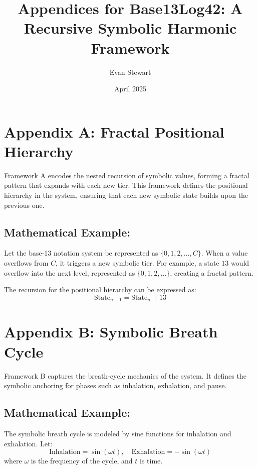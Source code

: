 \documentclass[12pt]{article}
\begin{document}
\title{Appendices for Base13Log42: A Recursive Symbolic Harmonic Framework}
\author{Evan Stewart}
\date{April 2025}
\maketitle

\tableofcontents
\newpage

\section*{Appendix A: Fractal Positional Hierarchy}

Framework A encodes the nested recursion of symbolic values, forming a fractal pattern that expands with each new tier. This framework defines the positional hierarchy in the system, ensuring that each new symbolic state builds upon the previous one.

\subsection*{Mathematical Example:}
Let the base-13 notation system be represented as $\{0, 1, 2, \dots, C\}$. When a value overflows from $C$, it triggers a new symbolic tier. For example, a state $13$ would overflow into the next level, represented as $\{0, 1, 2, \dots\}$, creating a fractal pattern.

The recursion for the positional hierarchy can be expressed as:
\[
\text{State}_{n+1} = \text{State}_n + 13
\]

\newpage

\section*{Appendix B: Symbolic Breath Cycle}

Framework B captures the breath-cycle mechanics of the system. It defines the symbolic anchoring for phases such as inhalation, exhalation, and pause.

\subsection*{Mathematical Example:}
The symbolic breath cycle is modeled by sine functions for inhalation and exhalation. Let:
\[
\text{Inhalation} = \sin(\omega t), \quad \text{Exhalation} = -\sin(\omega t)
\]
where $\omega$ is the frequency of the cycle, and $t$ is time.
\end{document}
